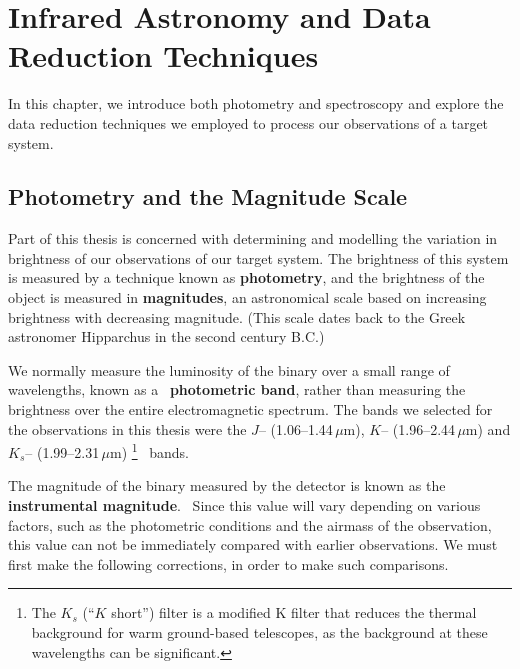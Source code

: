 
\chapter{Infrared Astronomy and Data Reduction Techniques}\label{cha:InfraredDataReductionTechniques}

In this chapter, we introduce both photometry and spectroscopy and explore the data reduction techniques we employed to process our observations of a target system. %


\section{Photometry and the Magnitude Scale}\label{cha:InfraredDataReductionTechniques:sec:MagnitudeScale}

Part of this thesis is concerned with determining and modelling the
variation in brightness of our observations of our target system. The brightness of this system is measured by a technique known as \textbf{photometry}, %
and the brightness of the object is measured in \textbf{magnitudes}, %
an astronomical scale based on increasing
brightness with decreasing magnitude. %
(This scale dates back to the Greek astronomer Hipparchus in
the second century B.C.) %

\vspace{\myparskip}

We normally measure the luminosity of the binary over a
small range of wavelengths, known as a%
\ \textbf{photometric band}, rather than measuring the brightness over the entire
electromagnetic spectrum. The bands we selected for the observations in this thesis were the $J$--
(1.06--1.44$\,\mu \mathrm{m}$), $K$-- (1.96--2.44$\,\mu \mathrm{m}$) and
$K_s$-- (1.99--2.31$\,\mu\mathrm{m}$)%
\footnote{\label{cha:InfraredDataReductionTechniques:sec:MagnitudeScale:subsec:Photometry:foot:Ks}
The $K_s$ (``$K$ short'') filter is a modified K filter
that reduces the thermal background for warm ground-based
telescopes, as the background at these wavelengths can be significant.}%
\ bands. %

\vspace{\myparskip}

The magnitude of the binary measured by the detector is known as the \textbf{instrumental magnitude}.%
\ Since this value will vary depending on various factors, such as the photometric conditions and the airmass of the observation, this value can not be immediately compared with earlier observations. We must first make the following corrections, in order to make such comparisons. %

